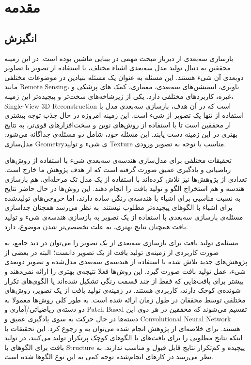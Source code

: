 \chapter{مقدمه}
\section{انگیزش}
بازسازی سه‌بعدی از دیرباز مبحث مهمی در بینایی ماشین بوده است. در این زمینه محققین به دنبال تولید مدل سه‌بعدی اشیاء مختلف، با استفاده از تصویر یا تصاویر دو‌بعدی آن شیء هستند. این مسئله به عنوان یک مسئله بنیادین در موضوعات مختلفی مانند \gls{Remote Sensing}، ناوبری، انیمیشن‌های سه‌بعدی، معماری، کمک های پزشکی و غیره، کاربرد‌های مختلفی دارد. یکی از زیرشاخه‌های سخت‌تر و پیچیده‌تر این زمینه، \gls{Single-View 3D Reconstruction} است که در آن هدف، بازسازی سه‌بعدی مدل با استفاده از تنها یک تصویر از شیء است. این زمینه امروزه در حال جذب توجه بیشتری از محققین است تا با استفاده از روش‌های نوین و سخت‌افزار‌های قوی‌تر، به نتایج بهتری در این زمینه دست یابند. این مسئله خود، شامل دو مسئله‌ی جداگانه می‌شود: مدل‌سازی \gls{Geometry}‌ی شیء و تولید \gls{Texture} مناسب با توجه به تصویر ورودی.

تحقیقات مختلفی برای مدل‌سازی هندسه‌ی سه‌بعدی شیء با استفاده از روش‌های ریاضیاتی\cite{SMH.Hosseini} و یادگیری عمیق\cite{fan2016point} صورت گرفته است که از هدف پژوهش ما خارج است. تعدادی از پژوهش‌ها نیز تلاش کرده‌اند با استفاده از یک مدل تک مرحله‌ای، هم بازسازی هندسه و هم استخراج الگو و تولید بافت را انجام دهند\cite{li2020selfsupervised}\cite{pavllo2020convolutional}. این روش‌ها در حال حاضر نتایج به نسبت مناسبی برای اشیاء با هندسه‌ی رنگی ساده دارند، اما خروجی‌های تولید‌شده برای اشیاء با الگو‌های پیچیده‌تر مطلوب نیستند. به نظر می‌رسد همچنان جداسازی مسئله‌ی بازسازی سه‌بعدی با استفاده از یک تصویر به بازسازی هندسه‌ی شیء و تولید بافت همچنان نتایج بهتری، به علت تخصصی‌تر شدن موضوع، دارد.

مسئله‌ی تولید بافت برای بازسازی سه‌بعدی از یک تصویر را می‌توان در دید جامع، به صورت کاربردی از زمینه‌ی تولید بافت از یک تصویر دانست؛ البته در بعضی از پژوهش‌های جدید تلاش شده با استفاده از هندسه‌ی سه‌بعدی مدل‌شده و تصویر دو‌بعدی شیء، عمل تولید بافت صورت گیرد\cite{oechsle2019texture}\cite{huang2020adversarial}. این روش‌ها فعلا نتیجه‌ی بهتری را ارائه نمی‌دهند و بیشتر برای بافت‌هایی که فقط از چند قسمت رنگی تشکیل شده‌اند یا الگوی‌های تکرار شونده‌ی کوچک دارند، کاربردی هستند. در زمینه‌ی تولید بافت از یک تصویر، روش‌های مختلفی توسط محققان در طول زمان ارائه شده است. به طور کلی روش‌ها معمولا به دو دسته‌ی ریاضیاتی/آماری\cite{RPN}\cite{PyramidTexSyn}\cite{FRAME} و \gls{Patch-Based}\cite{nonParam}\cite{imageQuilting}\cite{patchBasedSampling} تقسیم می‌شوند که محققین در هر دوی این دسته‌ها در حال حرکت به سوی یادگیری عمیق و \gls{Convolutional Neural Network}\cite{gatys2015texture}\cite{li2016combining} هستند. برای خلاصه‌ای از پژوهش انجام شده می‌توان به \cite{jetchev2017texture} و \cite{survey2020} رجوع کرد. این تحقیقات با اینکه نتایج مطلوبی را برای بافت‌های با الگو‌های کوچک پر‌تکرار تولید می‌کنند، در تولید بافت برای الگو‌های با \gls{Structure}‌ پیچیده و کم‌تکرار نتایج قابل قبول و مناسب ندارند. به نظر می‌رسد در کار‌های انجام‌شده توجه کمی به این نوع الگو‌ها شده است.

